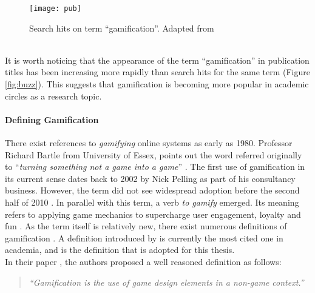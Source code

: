 \begin{figure}[h]
    \centering
    \texttt{[image: pub]}
    \caption{Search hits on term ``gamification''. Adapted from \cite{hamari2014does}}
    \label{fig:pub}
\end{figure}\\
It is worth noticing that the appearance of the term ``gamification'' in publication titles has been increasing more rapidly than search hits for the same term (Figure \ref{fig:buzz}). This suggests that gamification is becoming more popular in academic circles as a research topic.%
\paragraph{Defining Gamification}
There exist references to \textit{gamifying} online systems as early as 1980. Professor Richard Bartle from University of Essex, points out the word referred originally to ``\textit{turning something not a game into a game}'' \cite{werbach2012win}. The first use of gamification in its current sense dates back to 2002 by Nick Pelling as part of his consultancy business. However, the term did not see widespread adoption before the second half of 2010 \cite{marczewski2013gamification}. In parallel with this term, a verb \textit{to gamify} emerged. Its meaning refers to applying game mechanics to supercharge user engagement, loyalty and fun \cite{toGamify}. As the term itself is relatively  new,  there exist numerous definitions of gamification \cite{deterding2011game, werbach2012win, kapp2012gamification}. A definition introduced by \cite{deterding2011game} is currently the most cited one in academia, and is the definition that is adopted for this thesis.
\pagebreak
\\In their paper \cite{deterding2011game}, the authors proposed a well reasoned definition as follows:
\begin{quotation}
\textit{``Gamification is the use of game design elements in a non-game context.''}
\end{quotation}
